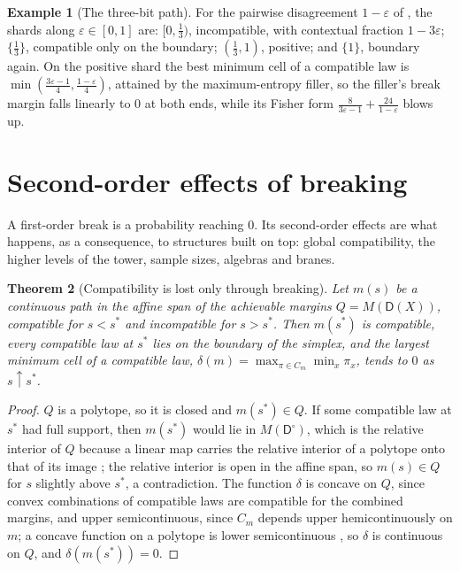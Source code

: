\documentclass[11pt]{article}
\newtheorem{theorem}{Theorem}[section]
\theoremstyle{definition}
\newtheorem{example}[theorem]{Example}
\theoremstyle{remark}
\newcommand{\D}{\mathsf{D}}
\begin{document}
\begin{example}[The three-bit path]\label{ex:path3}
For the pairwise disagreement $1-\varepsilon$ of \cite[Ex.~3.3]{Bridges}, the shards along $\varepsilon\in[0,1]$ are: $[0,\frac13)$, incompatible,
with contextual fraction $1-3\varepsilon$; $\{\frac13\}$, compatible only on the boundary; $(\frac13,1)$, positive; and $\{1\}$, boundary
again. On the positive shard the best minimum cell of a compatible law is $\min(\frac{3\varepsilon-1}4,\frac{1-\varepsilon}4)$, attained by the
maximum-entropy filler, so the filler's break margin falls linearly to $0$ at both ends, while its Fisher form
$\frac8{3\varepsilon-1}+\frac{24}{1-\varepsilon}$ blows up.
\end{example}

\section{Second-order effects of breaking}\label{sec:secondorder}

A first-order break is a probability reaching $0$. Its second-order effects are what happens, as a consequence, to structures built
on top: global compatibility, the higher levels of the tower, sample sizes, algebras and branes.

\begin{theorem}[Compatibility is lost only through breaking]\label{thm:lossbybreak}
Let $m(s)$ be a continuous path in the affine span of the achievable margins $Q=M(\D(X))$, compatible for $s<s^*$ and incompatible for
$s>s^*$. Then $m(s^*)$ is compatible, every compatible law at $s^*$ lies on the boundary of the simplex, and the largest minimum cell
of a compatible law, $\delta(m)=\max_{\pi\in C_m}\min_x\pi_x$, tends to $0$ as $s\uparrow s^*$.
\end{theorem}
\begin{proof}
$Q$ is a polytope, so it is closed and $m(s^*)\in Q$. If some compatible law at $s^*$ had full support, then $m(s^*)$ would lie in
$M(\D^\circ)$, which is the relative interior of $Q$ because a linear map carries the relative interior of a polytope onto that of its
image \cite[Thm.~6.6]{Rockafellar1970}; the relative interior is open in the affine span, so $m(s)\in Q$ for $s$ slightly above $s^*$, a contradiction. The function
$\delta$ is concave on $Q$, since convex combinations of compatible laws are compatible for the combined margins, and upper
semicontinuous, since $C_m$ depends upper hemicontinuously on $m$; a concave function on a polytope is lower semicontinuous
\cite{GaleKleeRockafellar1968}, so $\delta$ is continuous on $Q$, and $\delta(m(s^*))=0$.
\end{proof}
\end{document}
